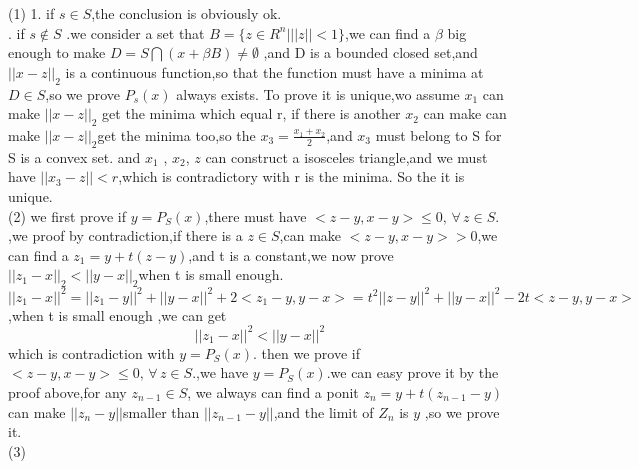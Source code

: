 \documentclass[11pt,letter,notitlepage]{article}
\begin{document}
\begin{solution}
	
	
	(1) 1. if $s \in S $,the conclusion is obviously ok. \\
. if $s \notin S $ .we consider a set that $B = \{z \in R^n|  ||z||<1 \}$,we can find a $\beta$ big enough to make $D = S \bigcap (x + \beta B )\neq \emptyset $ ,and D is a bounded closed set,and $||x-z||_2$ is a continuous function,so that the function must have a minima at $D \in S$,so we prove $P_s(x)$ always exists.
\indent	To prove it is unique,wo assume $x_1$ can make  $||x-z||_2$ get the minima which equal r, if there is another $x_2$ can make can make  $||x-z||_2$get the minima too,so the $x_3= \frac{x_1+x_2}{2} $,and $x_3$ must belong to S for S is a convex set.
and $x_1$ , $x_2$, $z$ can construct a isosceles triangle,and we must have $||x_3 -z|| < r$,which is contradictory with r is the minima.
So the it is unique. \\
\indent	(2)   we first prove if  $y=P_S(x)$,there must have $<z -y,x -y> \leq 0,\,\forall\,z\in S.$ ,we proof by contradiction,if there is a  $z\in S$,can make  $<z -y,x -y> > 0$,we can find a $z_1 = y + t(z-y)$,and t is a constant,we now prove $ ||z_1 - x||_2 < ||y -x||_2$when t is small enough.
	$$ ||z_1 - x||^2 = ||z_1 -y||^2 + ||y -x||^2 + 2<z_1 -y, y-x> = t^2||z-y||^2 + || y-x||^2   - 2t <z-y,y-x> $$,when t is small enough ,we can get $$ ||z_1 - x||^2 <  ||y -x||^2 $$ which is contradiction with  $y=P_S(x)$.
	then we prove if $<z -y,x -y> \leq 0,\,\forall\,z\in S.$,we have  $y=P_S(x)$.we can easy prove it by the proof above,for any $z_{n-1}\in S$, we always can find a ponit $z_n = y + t(z_{n-1}-y)$ can make $||z_n -y|| $smaller than $||z_{n-1} -y ||$,and the limit of $Z_n$ is $y$ ,so we prove it. \\
\indent	(3)  
\end{solution}
\end{document}
